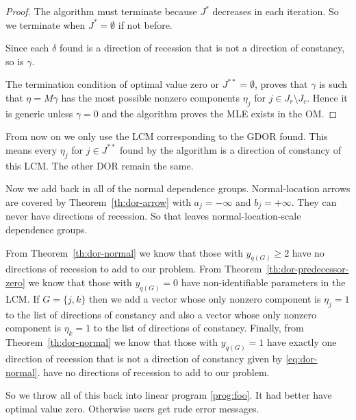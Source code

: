 \begin{proof}
The algorithm must terminate because $J^{*}$ decreases in each iteration.
So we terminate when $J^{*} = \emptyset$ if not before.

Since each $\delta$ found is a direction of recession that is not
a direction of constancy, so is $\gamma$.

The termination condition of optimal value zero or $J^{{*}{*}} = \emptyset$,
proves that $\gamma$ is such that $\eta = M \gamma$ has the most possible
nonzero components $\eta_j$ for $j \in J_r \setminus J_c$.  Hence it
is generic unless $\gamma = 0$ and the algorithm proves the MLE exists
in the OM.
\end{proof}

From now on we only use the LCM corresponding to the GDOR found.
This means every $\eta_j$ for $j \in J^{{*}{*}}$ found by the algorithm
is a direction of constancy of this LCM.  The other DOR remain the same.

Now we add back in all of the normal dependence groups.
Normal-location arrows are covered by Theorem~\ref{th:dor-arrow}
with $a_j = - \infty$ and $b_j = + \infty$.  They can never have
directions of recession.  So that leaves normal-location-scale dependence
groups.

From Theorem~\ref{th:dor-normal} we know that those with $y_{q(G)} \ge 2$
have no directions of recession to add to our problem.
From Theorem~\ref{th:dor-predecessor-zero} we know that
those with $y_{q(G)} = 0$ have non-identifiable parameters in the LCM.
If $G = \{ j, k \}$ then we add a vector whose only nonzero component
is $\eta_j = 1$ to the list of directions of constancy and also a vector
whose only nonzero component
is $\eta_k = 1$ to the list of directions of constancy.
Finally, from Theorem~\ref{th:dor-normal} we know that those
with $y_{q(G)} = 1$ have exactly one direction of recession that is not
a direction of constancy given by \eqref{eq:dor-normal}.
have no directions of recession to add to our problem.

So we throw all of this back into linear program \eqref{prog:foo}.
It had better have optimal value zero.
Otherwise users get rude error messages.
